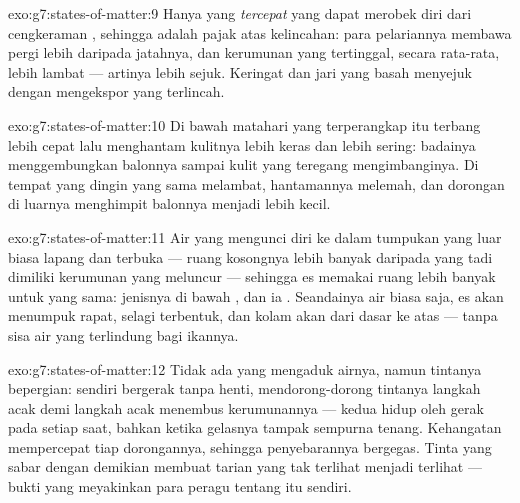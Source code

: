 \begin{solution}{exo:g7:states-of-matter:9}
Hanya  yang \emph{tercepat} yang dapat merobek diri dari
cengkeraman , sehingga  adalah pajak atas
kelincahan: para pelariannya membawa pergi lebih daripada jatahnya,
dan kerumunan yang tertinggal, secara rata-rata, lebih lambat ---
artinya lebih sejuk. Keringat dan jari yang basah menyejuk dengan
mengekspor yang terlincah.
\end{solution}

\begin{solution}{exo:g7:states-of-matter:10}
Di bawah matahari  yang terperangkap itu terbang lebih cepat
lalu menghantam kulitnya lebih keras dan lebih sering: badainya
menggembungkan balonnya sampai kulit yang teregang mengimbanginya. Di
tempat yang dingin  yang sama melambat, hantamannya melemah,
dan dorongan  di luarnya menghimpit balonnya menjadi lebih kecil.
\end{solution}

\begin{solution}{exo:g7:states-of-matter:11}
Air yang  mengunci diri ke dalam tumpukan yang luar biasa
lapang dan terbuka --- ruang kosongnya lebih banyak daripada yang tadi
dimiliki kerumunan yang meluncur --- sehingga es memakai ruang lebih
banyak untuk  yang sama:  jenisnya di bawah 
, dan ia . Seandainya air biasa saja, es akan
menumpuk rapat,  selagi terbentuk, dan kolam akan 
dari dasar ke atas --- tanpa sisa air yang terlindung bagi ikannya.
\end{solution}

\begin{solution}{exo:g7:states-of-matter:12}
Tidak ada yang mengaduk airnya, namun tintanya bepergian:   sendiri bergerak tanpa henti, mendorong-dorong 
tintanya langkah acak demi langkah acak menembus kerumunannya ---
kedua  hidup oleh gerak pada setiap saat, bahkan ketika
gelasnya tampak sempurna tenang. Kehangatan mempercepat tiap
dorongannya, sehingga penyebarannya bergegas. Tinta yang sabar dengan
demikian membuat tarian yang tak terlihat menjadi terlihat --- bukti
yang meyakinkan para peragu tentang  itu sendiri.
\end{solution}

